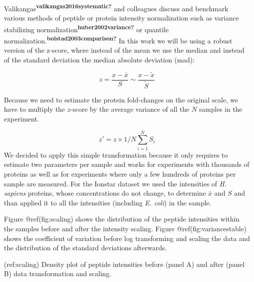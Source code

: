 \documentclass[journal=jacsat,manuscript=article]{achemso}
\begin{document}
Valikangas\textsuperscript{\textbf{valikangas2016systematic?}} and
colleagues discuss and benchmark various methods of peptide or protein
intensity normalization such as variance stabilizing
normalization\textsuperscript{\textbf{huber2002variance?}} or quantile
normalization.\textsuperscript{\textbf{bolstad2003comparison?}} In this
work we will be using a robust version of the z-score, where instead of
the mean we use the median and instead of the standard deviation the
median absolute deviation (mad):

\[
z = \frac{x - \bar{x}}{S} \sim \frac{x - \tilde{x}}{\tilde{S}}
\]

Because we need to estimate the protein fold-changes on the original
scale, we have to multiply the \(z\)-score by the average variance of
all the \(N\) samples in the experiment.

\[
z' = z \times 1/N\sum_{i=1}^N S_i
\] We decided to apply this simple transformation because it only
requires to estimate two parameters per sample and works for experiments
with thousands of proteins as well as for experiments where only a few
hundreds of proteins per sample are measured. For the Ionstar dataset we
used the intensities of \emph{H. sapiens} proteins, whose concentrations
do not change, to determine \(\bar{x}\) and \(S\) and than applied it to
all the intensities (including \emph{E. coli}) in the sample.

Figure @ref(fig:scaling) shows the distribution of the peptide
intensities within the samples before and after the intensity scaling.
Figure @ref(fig:variancestable) shows the coefficient of variation
before log transforming and scaling the data and the distribution of the
standard deviations afterwards.

(ref:scaling) Density plot of peptide intensities before (panel A) and
after (panel B) data transformation and scaling.
\end{document}
